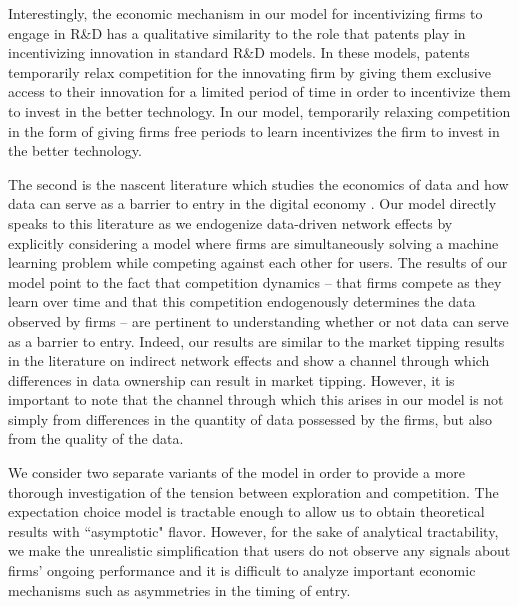 Interestingly, the economic mechanism in our model for incentivizing firms to engage in R\&D has a qualitative similarity to the role that patents play in incentivizing innovation in standard R\&D models. In these models, patents temporarily relax competition for the innovating firm by giving them exclusive access to their innovation for a limited period of time in order to incentivize them to invest in the better technology. In our model, temporarily relaxing competition in the form of giving firms free periods to learn incentivizes the firm to invest in the better technology.

The second is the nascent literature which studies the economics of data and how data can serve as a barrier to entry in the digital economy \cite{de2020data, hagiu2020data}. Our model directly speaks to this literature as we endogenize data-driven network effects by explicitly considering a model where firms are simultaneously solving a machine learning problem while competing against each other for users. The results of our model point to the fact that competition dynamics -- that firms compete as they learn over time and that this competition endogenously determines the data observed by firms -- are pertinent to understanding whether or not data can serve as a barrier to entry. Indeed, our results are similar to the market tipping results in the literature on indirect network effects and show a channel through which differences in data ownership can result in market tipping. However, it is important to note that the channel through which this arises in our model is not simply from differences in the quantity of data possessed by the firms, but also from the quality of the data.

We consider two separate variants of the model in order to provide a more thorough investigation of the tension between exploration and competition. The expectation choice model is tractable enough to allow us to obtain theoretical results with ``asymptotic" flavor. However, for the sake of analytical tractability, we make the unrealistic simplification that users do not observe any signals about firms' ongoing performance and it is difficult to analyze important economic mechanisms such as asymmetries in the timing of entry.

